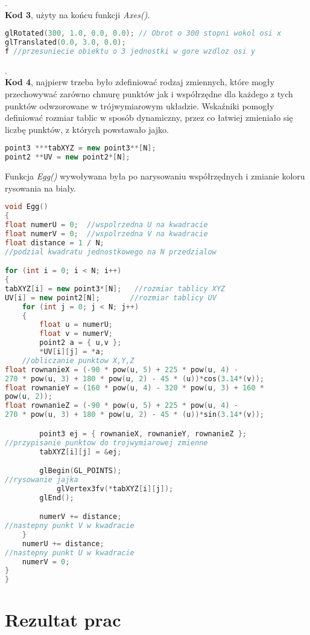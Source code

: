 \documentclass[a4paper,11pt]{article}
\begin{document}
.\\
\textbf{Kod 3}, użyty na końcu funkcji \textit{Axes()}.   
{\small
\begin{lstlisting}[language=C++]
glRotated(300, 1.0, 0.0, 0.0); // Obrot o 300 stopni wokol osi x
glTranslated(0.0, 3.0, 0.0);
f //przesuniecie obiektu o 3 jednostki w gore wzdloz osi y
\end{lstlisting}
}
.\\
\textbf{Kod 4}, najpierw trzeba było zdefiniować rodzaj zmiennych, które mogły przechowywać zarówno chmurę punktów jak i współrzędne dla każdego z tych punktów odwzorowane w trójwymiarowym układzie. Wskaźniki pomogły definiować rozmiar tablic w sposób dynamiczny, przez co łatwiej zmieniało się liczbę punktów, z których powstawało jajko.   
{\small
\begin{lstlisting}[language=C++]
point3 ***tabXYZ = new point3**[N];
point2 **UV = new point2*[N];
\end{lstlisting}
}
Funkcja \textit{Egg()} wywoływana była po narysowaniu współrzędnych i zmianie koloru rysowania na biały. 

{\small
\begin{lstlisting}[language=C++]
void Egg()
{
float numerU = 0;  //wspolrzedna U na kwadracie
float numerV = 0;  //wspolrzedna V na kwadracie
float distance = 1 / N;  
//podzial kwadratu jednostkowego na N przedzialow

for (int i = 0; i < N; i++)
{
tabXYZ[i] = new point3*[N];   //rozmiar tablicy XYZ
UV[i] = new point2[N];		 //rozmiar tablicy UV
	for (int j = 0; j < N; j++)
	{
		float u = numerU;
		float v = numerV;
		point2 a = { u,v };
		*UV[i][j] = *a;
	//obliczanie punktow X,Y,Z
float rownanieX = (-90 * pow(u, 5) + 225 * pow(u, 4) - 
270 * pow(u, 3) + 180 * pow(u, 2) - 45 * (u))*cos(3.14*(v));
float rownanieY = (160 * pow(u, 4) - 320 * pow(u, 3) + 160 * 
pow(u, 2));
float rownanieZ = (-90 * pow(u, 5) + 225 * pow(u, 4) - 
270 * pow(u, 3) + 180 * pow(u, 2) - 45 * (u))*sin(3.14*(v));

		point3 ej = { rownanieX, rownanieY, rownanieZ }; 
//przypisanie punktow do trojwymiarowej zmienne
		tabXYZ[i][j] = &ej;

		glBegin(GL_POINTS);		
//rysowanie jajka
			glVertex3fv(*tabXYZ[i][j]);   
		glEnd();

		numerV += distance;	
//nastepny punkt V w kwadracie  
	}
	numerU += distance;	
//nastepny punkt U w kwadracie  
	numerV = 0;
}
}
\end{lstlisting}
}

  \section{Rezultat prac}
\end{document}
